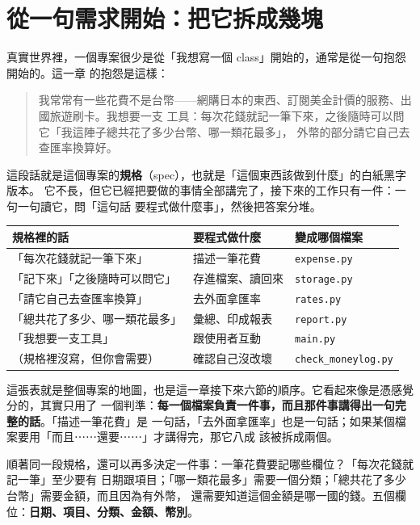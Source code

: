 \section{從一句需求開始：把它拆成幾塊}
\label{sec:capstone-spec}

真實世界裡，一個專案很少是從「我想寫一個 class」開始的，通常是從一句抱怨開始的。這一章
的抱怨是這樣：

\begin{quote}
我常常有一些花費不是台幣——網購日本的東西、訂閱美金計價的服務、出國旅遊刷卡。我想要一支
工具：每次花錢就記一筆下來，之後隨時可以問它「我這陣子總共花了多少台幣、哪一類花最多」，
外幣的部分請它自己去查匯率換算好。
\end{quote}

這段話就是這個專案的\textbf{規格}（spec），也就是「這個東西該做到什麼」的白紙黑字版本。
它不長，但它已經把要做的事情全部講完了，接下來的工作只有一件：一句一句讀它，問「這句話
要程式做什麼事」，然後把答案分堆。

\begin{center}
\begin{tabular}{@{}p{5.2cm}p{3.6cm}p{4.2cm}@{}}
\toprule
規格裡的話 & 要程式做什麼 & 變成哪個檔案 \\
\midrule
「每次花錢就記一筆下來」 & 描述一筆花費 & \texttt{expense.py} \\
「記下來」「之後隨時可以問它」 & 存進檔案、讀回來 & \texttt{storage.py} \\
「請它自己去查匯率換算」 & 去外面拿匯率 & \texttt{rates.py} \\
「總共花了多少、哪一類花最多」 & 彙總、印成報表 & \texttt{report.py} \\
「我想要一支工具」 & 跟使用者互動 & \texttt{main.py} \\
（規格裡沒寫，但你會需要） & 確認自己沒改壞 & \texttt{check\_moneylog.py} \\
\bottomrule
\end{tabular}
\end{center}

這張表就是整個專案的地圖，也是這一章接下來六節的順序。它看起來像是憑感覺分的，其實只用了
一個判準：\textbf{每一個檔案負責一件事，而且那件事講得出一句完整的話}。「描述一筆花費」是
一句話，「去外面拿匯率」也是一句話；如果某個檔案要用「而且⋯⋯還要⋯⋯」才講得完，那它八成
該被拆成兩個。

順著同一段規格，還可以再多決定一件事：一筆花費要記哪些欄位？「每次花錢就記一筆」至少要有
日期跟項目；「哪一類花最多」需要一個分類；「總共花了多少台幣」需要金額，而且因為有外幣，
還需要知道這個金額是哪一國的錢。五個欄位：\textbf{日期、項目、分類、金額、幣別}。

